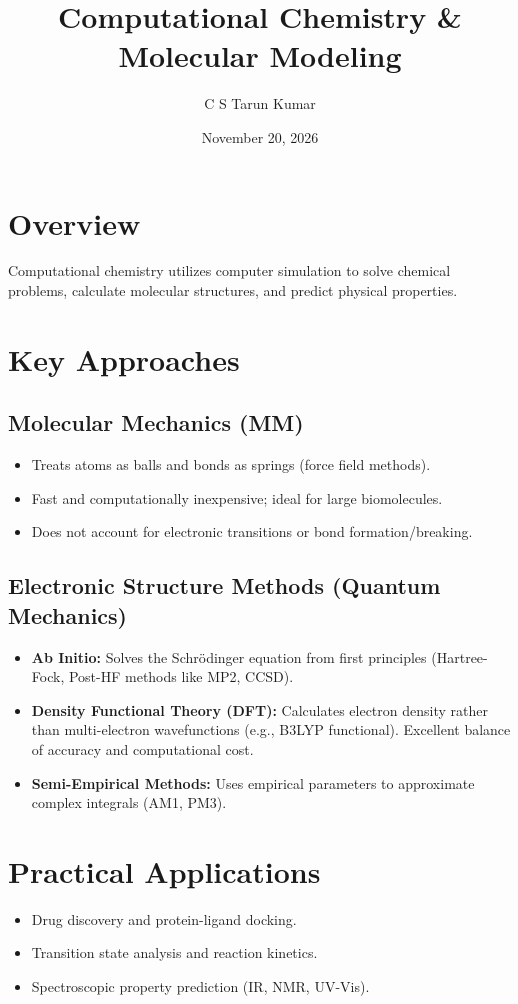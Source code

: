 \documentclass[11pt,a4paper]{article}
\title{\textbf{Computational Chemistry \& Molecular Modeling}}
\author{C S Tarun Kumar}
\date{November 20, 2026}
\begin{document}
\maketitle

\section{Overview}
Computational chemistry utilizes computer simulation to solve chemical problems, calculate molecular structures, and predict physical properties.

\section{Key Approaches}
\subsection{Molecular Mechanics (MM)}
\begin{itemize}
    \item Treats atoms as balls and bonds as springs (force field methods).
    \item Fast and computationally inexpensive; ideal for large biomolecules.
    \item Does not account for electronic transitions or bond formation/breaking.
\end{itemize}

\subsection{Electronic Structure Methods (Quantum Mechanics)}
\begin{itemize}
    \item \textbf{Ab Initio:} Solves the Schrödinger equation from first principles (Hartree-Fock, Post-HF methods like MP2, CCSD).
    \item \textbf{Density Functional Theory (DFT):} Calculates electron density rather than multi-electron wavefunctions (e.g., B3LYP functional). Excellent balance of accuracy and computational cost.
    \item \textbf{Semi-Empirical Methods:} Uses empirical parameters to approximate complex integrals (AM1, PM3).
\end{itemize}

\section{Practical Applications}
\begin{itemize}
    \item Drug discovery and protein-ligand docking.
    \item Transition state analysis and reaction kinetics.
    \item Spectroscopic property prediction (IR, NMR, UV-Vis).
\end{itemize}
\end{document}
